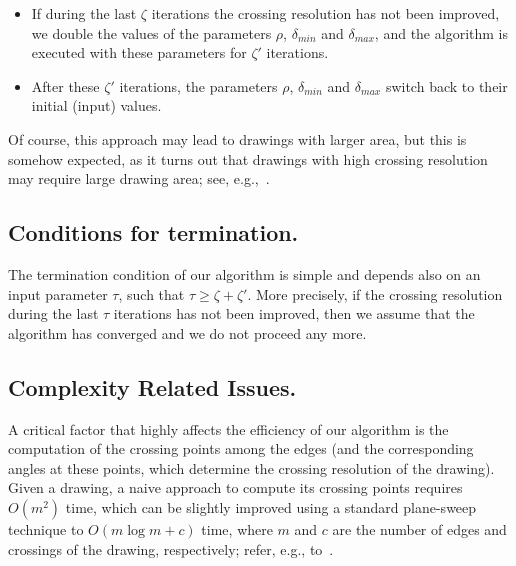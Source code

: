 \documentclass[runningheads]{llncs}
\begin{document}
\begin{itemize}
\item If during the last $\zeta$ iterations the crossing resolution has not been improved, we double the values of the parameters $\rho$, $\delta_{min}$ and $\delta_{max}$, and the algorithm is executed with these parameters for $\zeta'$ iterations.
\item After these $\zeta'$ iterations, the parameters $\rho$, $\delta_{min}$ and $\delta_{max}$ switch back to their initial (input) values.
\end{itemize}
%
Of course, this approach may lead to drawings with larger area, but this is somehow expected, as it turns out that drawings with high crossing resolution may require large drawing area; see, e.g.,~\cite{DBLP:journals/jgaa/AngeliniCDFBKS11,DBLP:journals/tcs/BrandenburgDEKL16}. 

\subsection{Conditions for termination.}
\label{ssec:termination}

The termination condition of our algorithm is simple and depends also on an input parameter $\tau$, such that $\tau \geq \zeta + \zeta'$. More precisely, if the crossing resolution during the last $\tau$ iterations has not been improved, then we assume that the algorithm has converged and we do not proceed any more.

\subsection{Complexity Related Issues.}
\label{ssec:complexity}

A critical factor that highly affects the efficiency of our algorithm is the computation of the crossing points among the edges (and the corresponding angles at these points, which determine the crossing resolution of the drawing). Given  a drawing, a naive approach to compute its crossing points requires $O(m^2)$ time, which can be slightly improved using a standard plane-sweep technique to $O(m \log m + c)$ time, where $m$ and $c$ are the number of edges and crossings of the drawing, respectively; refer, e.g., to~\cite{DBLP:books/lib/BergCKO08}. 
\end{document}
